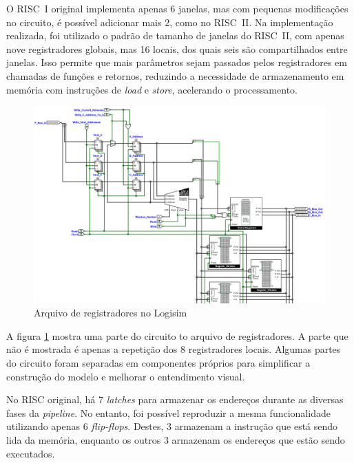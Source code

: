 \documentclass[
	article,			%
	11pt,				%
	oneside,			%
	a4paper,			%
	english,			%
	brazil,				%
	sumario=tradicional
	]{abntex2}
\begin{document}
O RISC~I original implementa apenas 6 janelas, mas com pequenas modificações no circuito, é possível adicionar mais 2, como no RISC~II. Na implementação realizada, foi utilizado o padrão de tamanho de janelas do RISC~II, com apenas nove registradores globais, mas 16 locais, dos quais seis são compartilhados entre janelas. Isso permite que mais parâmetros sejam passados pelos registradores em chamadas de funções e retornos, reduzindo a necessidade de armazenamento em memória com instruções de \textit{load} e \textit{store}, acelerando o processamento.
\begin{figure}[H]
    \centering
    \includegraphics[width=0.75\linewidth]{Logisim/registerFile.png}
    \caption{Arquivo de registradores no Logisim}
    \label{fig:RegisterFile}
\end{figure}
A figura \ref{fig:RegisterFile} mostra uma parte do circuito to arquivo de registradores. A parte que não é mostrada é apenas a repetição dos 8 registradores locais. Algumas partes do circuito foram separadas em componentes próprios para simplificar a construção do modelo e melhorar o entendimento visual.

No RISC original, há 7 \textit{latches} para armazenar os endereços durante as diversas fases da \textit{pipeline}. No entanto, foi possível reproduzir a mesma funcionalidade utilizando apenas 6 \textit{flip-flops}. Destes, 3 armazenam a instrução que está sendo lida da memória, enquanto os outros 3 armazenam os endereços que estão sendo executados.
\end{document}
